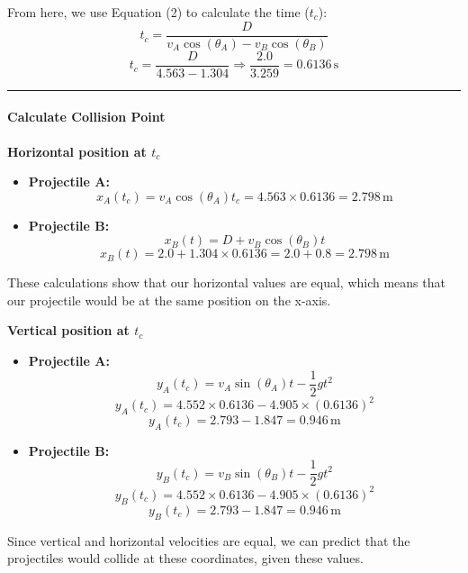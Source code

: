 \documentclass[12pt]{article}
\begin{document}
From here, we use Equation (2) to calculate the time (\( t_c \)):
\[
t_c = \frac{D}{v_A \cos(\theta_A) - v_B \cos(\theta_B)}
\]
\[
t_c = \frac{D}{4.563 - 1.304} \Rightarrow \frac{2.0}{3.259} = 0.6136 \, \text{s}
\]

\vspace{0.5cm} %
\begin{center}
    \rule{0.9\textwidth}{0.5pt} %
\end{center}
\vspace{0.5cm} %

\paragraph{\large \textbf{Calculate Collision Point}}

\textbf{Horizontal position at \( t_c \)}
\begin{itemize}
    \item \textbf{Projectile A:}
    \[
    x_A(t_c) = v_A \cos(\theta_A) t_c = 4.563 \times 0.6136 = 2.798 \, \text{m}
    \]
    
    \item \textbf{Projectile B:}
    \[
    x_B(t) = D + v_B \cos(\theta_B) t
    \]
    \[
    x_B(t) = 2.0 + 1.304 \times 0.6136 = 2.0 + 0.8 = 2.798 \, \text{m}
    \]
\end{itemize}

These calculations show that our horizontal values are equal, which means that our projectile would be at the same position on the x-axis.

\textbf{Vertical position at \( t_c \)}
\begin{itemize}
    \item \textbf{Projectile A:}
    \[
    y_A(t_c) = v_A \sin(\theta_A) t - \frac{1}{2} g t^2
    \]
    \[
    y_A(t_c) = 4.552 \times 0.6136 - 4.905 \times (0.6136)^2
    \]
    \[
    y_A(t_c) = 2.793 - 1.847 = 0.946 \, \text{m}
    \]

    \item \textbf{Projectile B:}
    \[
    y_B(t_c) = v_B \sin(\theta_B) t - \frac{1}{2} g t^2
    \]
    \[
    y_B(t_c) = 4.552 \times 0.6136 - 4.905 \times (0.6136)^2
    \]
    \[
    y_B(t_c) = 2.793 - 1.847 = 0.946 \, \text{m}
    \]
\end{itemize}

Since vertical and horizontal velocities are equal, we can predict that the projectiles would collide at these coordinates, given these values.
\end{document}
